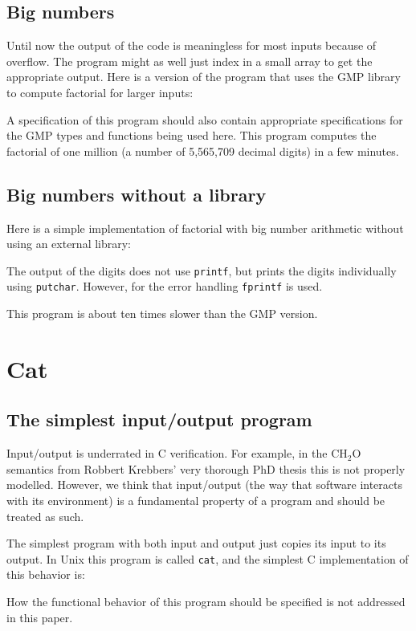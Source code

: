 \documentclass{article}
\begin{document}
\subsection{Big numbers}
Until now the output of the code is meaningless for most inputs because of overflow.
The program might as well just index in a small array to get the appropriate
output.
Here is a version of the program that uses the GMP library \cite{gra:16} to
compute factorial for larger inputs:

A specification of this program should also contain appropriate specifications
for the GMP types and functions being used here.
This program computes the factorial of one million (a number of 5,565,709 decimal digits)
in a few minutes.

\subsection{Big numbers without a library}
Here is a simple implementation of factorial with big number arithmetic without
using an external library:

The output of the digits does not use \texttt{printf}, but prints
the digits individually using \texttt{putchar}.
However, for the error handling \texttt{fprintf} is used.

This program is about ten times slower than the GMP version.

\section{Cat}

\subsection{The simplest input/output program}
Input/output is underrated in C verification.
For example, in the CH$_2$O semantics from Robbert Krebbers' very thorough PhD thesis \cite{kre:15} this
is not properly modelled.
However, we think that input/output (the way that
software interacts with its environment) is a fundamental property of a program
and should be treated as such.

The simplest program with both input and output just copies its input to its output.
In Unix this program is called \texttt{cat}, and the simplest C implementation of this behavior is:

How the functional behavior of this program should be {specified} is not addressed in this paper.
\end{document}
